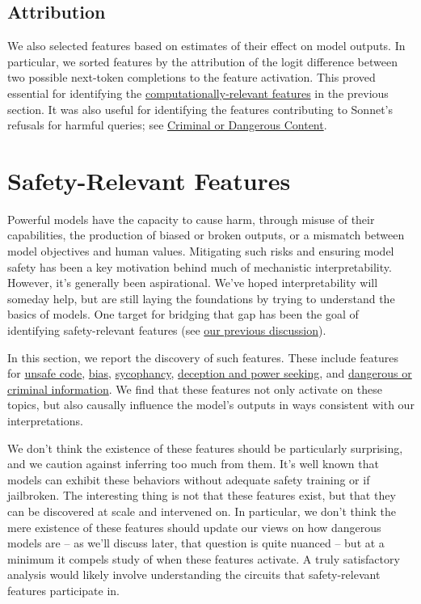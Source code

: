 \documentclass{article}
\let\oldsection\section
\renewcommand{\section}{\FloatBarrier\oldsection}
\let\oldsubsection\subsection
\renewcommand{\subsection}{\FloatBarrier\oldsubsection}
\begin{document}
\subsection{Attribution}\label{sec:searching-attribution}

We also selected features based on estimates of their effect on model outputs. In particular, we sorted features by the attribution of the logit difference between two possible next-token completions to the feature activation. This proved essential for identifying the \hyperref[sec:computational]{computationally-relevant features} in the previous section. It was also useful for identifying the features contributing to Sonnet's refusals for harmful queries; see \hyperref[sec:safety-relevant-criminal]{Criminal or Dangerous Content}.

\section{Safety-Relevant Features}\label{sec:safety-relevant}

Powerful models have the capacity to cause harm, through misuse of their capabilities, the production of biased or broken outputs, or a mismatch between model objectives and human values. Mitigating such risks and ensuring model safety has been a key motivation behind much of mechanistic interpretability. However, it's generally been aspirational. We've hoped interpretability will someday help, but are still laying the foundations by trying to understand the basics of models. One target for bridging that gap has been the goal of identifying safety-relevant features (see \href{https://transformer-circuits.pub/2023/july-update/index.html\#safety-features}{our previous discussion}).

In this section, we report the discovery of such features. These include features for \hyperref[sec:safety-relevant-code]{unsafe code}, \hyperref[sec:safety-relevant-bias]{bias}, \hyperref[sec:safety-relevant-sycophancy]{sycophancy}, \hyperref[sec:safety-relevant-deception]{deception and power seeking}, and \hyperref[sec:safety-relevant-criminal]{dangerous or criminal information}. We find that these features not only activate on these topics, but also causally influence the model’s outputs in ways consistent with our interpretations.

We don't think the existence of these features should be particularly surprising, and we caution against inferring too much from them. It's well known that models can exhibit these behaviors without adequate safety training or if jailbroken. The interesting thing is not that these features exist, but that they can be discovered at scale and intervened on. In particular, we don't think the mere existence of these features should update our views on how dangerous models are -- as we'll discuss later, that question is quite nuanced -- but at a minimum it compels study of when these features activate. A truly satisfactory analysis would likely involve understanding the circuits that safety-relevant features participate in.
\end{document}
